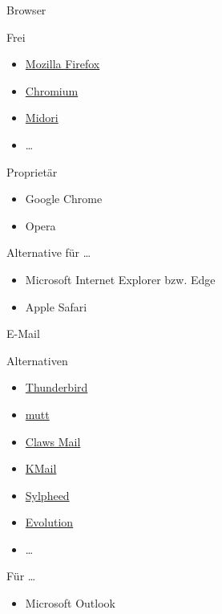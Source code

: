 \documentclass{beamer}
\begin{document}
\begin{frame}{Browser}
    {
    }
    {
        \begin{block}{Frei}
            \begin{itemize}
                \item \href{https://www.mozilla.org/firefox/}{Mozilla
                    Firefox}
                \item \href{https://chromium.org/}{Chromium}
                \item \href{http://www.midori-browser.org/}{Midori}
                \item …
            \end{itemize}
        \end{block}
        \begin{block}{Proprietär}
            \begin{itemize}
                \item Google Chrome
                \item Opera
            \end{itemize}
        \end{block}
        \begin{block}{Alternative für …}
            \begin{itemize}
                \item Microsoft Internet Explorer bzw. Edge
                \item Apple Safari
            \end{itemize}
        \end{block}
    }
\end{frame}

\begin{frame}{E-Mail}
    {
    }
    {
        \begin{block}{Alternativen}
            \begin{itemize}
                \item \href{https://www.thunderbird.net/}{Thunderbird}
                \item \href{http://www.mutt.org/}{mutt}
                \item \href{http://www.claws-mail.org/}{Claws Mail}
                \item \href{http://kontact.org/}{KMail}
                \item \href{http://sylpheed.sraoss.jp/en/}{Sylpheed}
                \item
                    \href{https://wiki.gnome.org/Apps/Evolution}{Evolution}
                \item …
            \end{itemize}
        \end{block}
        \begin{block}{Für …}
            \begin{itemize}
                \item Microsoft Outlook
            \end{itemize}
        \end{block}
    }
\end{frame}
\end{document}
